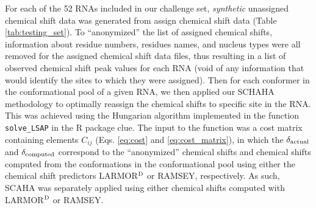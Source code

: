 \documentclass[journal=jcisd8,manuscript=article,layout=onecolumn]{achemso}
\begin{document}
For each of the 52 RNAs included in our challenge set, \textit{synthetic} unassigned chemical shift data was generated from assign chemical shift data (Table \ref{tab:testing_set}). To  ``anonymized''  the list of assigned chemical shifts, information about residue numbers, residues names, and nucleus types were all removed for the assigned chemical shift data files, thus resulting in a list of observed chemical shift peak values for each RNA (void of any information that would identify the sites to which they were assigned). Then for each conformer in the conformational pool of a given RNA, we then applied our SCHAHA methodology to optimally reassign the chemical shifts to specific site in the RNA. This was achieved using the Hungarian algorithm implemented in the function {\texttt{solve\_LSAP}} in the R package clue\cite{hornik2005a}. The input to the function was a cost matrix containing elements $C_{ij}$ (Eqs. \ref{eq:cost} and \ref{eq:cost_matrix}), in which the $\delta_{\rm actual}$ and $\delta_{\rm computed}$ correspond to the ``anonymized''  chemical shifts and chemical shifts computed from the conformations in the conformational pool using either the chemical shift predictors LARMOR$^{\rm D}$\cite{frank2014simple} or  RAMSEY\cite{frank2013prediction}, respectively. As such, SCAHA was separately applied using either chemical shifts computed with  LARMOR$^{\rm D}$ or RAMSEY.
\end{document}
